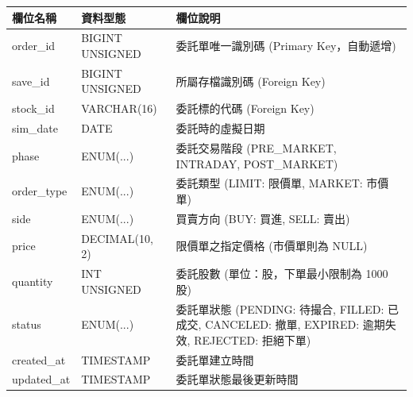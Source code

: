 \documentclass[UTF8, a4paper, 12pt, fontset=none]{ctexart}
\begin{document}
    \begin{center}
    \begin{tabular}{|l|l|p{8cm}|}
    \hline
    \textbf{欄位名稱} & \textbf{資料型態} & \textbf{欄位說明} \\ \hline
    order\_id & BIGINT UNSIGNED & 委託單唯一識別碼 (Primary Key，自動遞增) \\ \hline
    save\_id & BIGINT UNSIGNED & 所屬存檔識別碼 (Foreign Key) \\ \hline
    stock\_id & VARCHAR(16) & 委託標的代碼 (Foreign Key) \\ \hline
    sim\_date & DATE & 委託時的虛擬日期 \\ \hline
    phase & ENUM(...) & 委託交易階段 (PRE\_MARKET, INTRADAY, POST\_MARKET) \\ \hline
    order\_type & ENUM(...) & 委託類型 (LIMIT: 限價單, MARKET: 市價單) \\ \hline
    side & ENUM(...) & 買賣方向 (BUY: 買進, SELL: 賣出) \\ \hline
    price & DECIMAL(10, 2) & 限價單之指定價格 (市價單則為 NULL) \\ \hline
    quantity & INT UNSIGNED & 委託股數 (單位：股，下單最小限制為 1000 股) \\ \hline
    status & ENUM(...) & 委託單狀態 (PENDING: 待撮合, FILLED: 已成交, CANCELED: 撤單, EXPIRED: 逾期失效, REJECTED: 拒絕下單) \\ \hline
    created\_at & TIMESTAMP & 委託單建立時間 \\ \hline
    updated\_at & TIMESTAMP & 委託單狀態最後更新時間 \\ \hline
    \end{tabular}
    \end{center}
\end{document}
